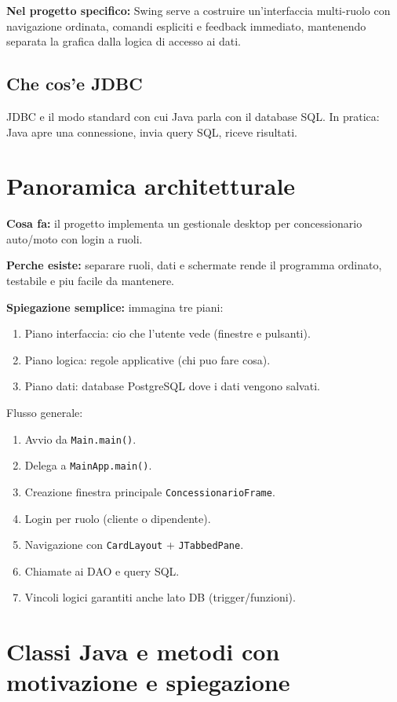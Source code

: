 \documentclass[12pt,a4paper]{article}
\begin{document}
\textbf{Nel progetto specifico:}
Swing serve a costruire un'interfaccia multi-ruolo con navigazione ordinata, comandi espliciti e feedback immediato,
mantenendo separata la grafica dalla logica di accesso ai dati.

\subsection{Che cos'e JDBC}
JDBC e il modo standard con cui Java parla con il database SQL.
In pratica: Java apre una connessione, invia query SQL, riceve risultati.

\section{Panoramica architetturale}
\textbf{Cosa fa:} il progetto implementa un gestionale desktop per concessionario auto/moto con login a ruoli.

\textbf{Perche esiste:} separare ruoli, dati e schermate rende il programma ordinato, testabile e piu facile da mantenere.

\textbf{Spiegazione semplice:} immagina tre piani:
\begin{enumerate}
  \item Piano interfaccia: cio che l'utente vede (finestre e pulsanti).
  \item Piano logica: regole applicative (chi puo fare cosa).
  \item Piano dati: database PostgreSQL dove i dati vengono salvati.
\end{enumerate}

Flusso generale:
\begin{enumerate}
  \item Avvio da \texttt{Main.main()}.
  \item Delega a \texttt{MainApp.main()}.
  \item Creazione finestra principale \texttt{ConcessionarioFrame}.
  \item Login per ruolo (cliente o dipendente).
  \item Navigazione con \texttt{CardLayout} + \texttt{JTabbedPane}.
  \item Chiamate ai DAO e query SQL.
  \item Vincoli logici garantiti anche lato DB (trigger/funzioni).
\end{enumerate}

\section{Classi Java e metodi con motivazione e spiegazione}
\end{document}
